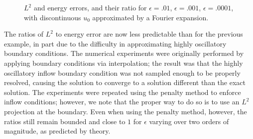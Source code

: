 \documentclass[11pt,onecolumn]{scrartcl}
\begin{document}
\begin{figure}[h!]
\centering
{}
\caption{$L^2$ and energy errors, and their ratio for $\epsilon=.01$, $\epsilon=.001$, $\epsilon=.0001$, with discontinuous $u_0$ approximated by a Fourier expansion. }
\label{disc_sol_fourier}
\end{figure}

The ratios of $L^2$ to energy error are now less predictable than for the previous example, in part due to the difficulty in approximating highly oscillatory boundary conditions. The numerical experiments were originally performed by applying boundary conditions via interpolation; the result was that the highly oscillatory inflow boundary condition was not sampled enough to be properly resolved, causing the solution to converge to a solution different than the exact solution.  The experiments were repeated using the penalty method to enforce inflow conditions; however, we note that the proper way to do so is to use an $L^2$ projection at the boundary.  Even when using the penalty method, however, the ratios still remain bounded and close to $1$ for $\epsilon$ varying over two orders of magnitude, as predicted by theory. 
\end{document}
